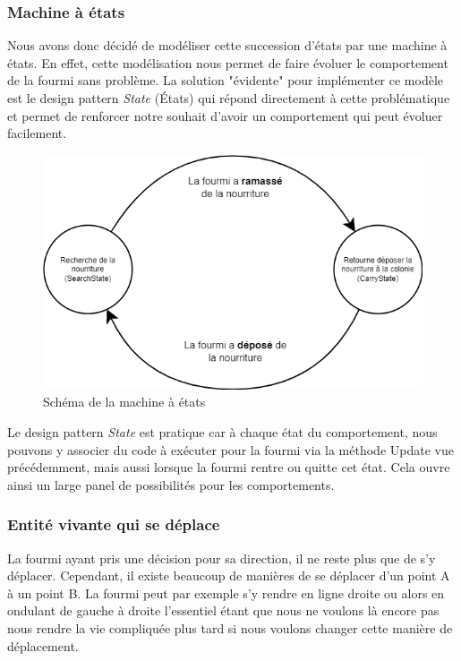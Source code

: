 \documentclass{EPUProjetDi}
\begin{document}
\subsubsection{Machine à états}

Nous avons donc décidé de modéliser cette succession d'états par une machine à états. En effet, cette modélisation nous permet de faire évoluer 
le comportement de la fourmi sans problème. La solution "évidente" pour implémenter ce modèle est le design pattern \textit{State} (États) qui répond
directement à cette problématique et permet de renforcer notre souhait d'avoir un comportement qui peut évoluer facilement.

\begin{figure}[h]
    \centering
    \includegraphics[scale=0.4]{statemachine.png}
    \caption{Schéma de la machine à états}
    \label{fig:state_machine}
\end{figure}

Le design pattern \textit{State} est pratique car à chaque état du comportement, nous pouvons y associer du code à exécuter pour la fourmi via la méthode 
Update vue précédemment, mais aussi lorsque la fourmi rentre ou quitte cet état. Cela ouvre ainsi un large panel de possibilités pour les comportements. 
 
\subsubsection{Entité vivante qui se déplace}

La fourmi ayant pris une décision pour sa direction, il ne reste plus que de s'y déplacer. Cependant, il existe beaucoup de manières de se déplacer
d'un point A à un point B. La fourmi peut par exemple s'y rendre en ligne droite ou alors en ondulant de gauche à droite l'essentiel étant que nous
ne voulons là encore pas nous rendre la vie compliquée plus tard si nous voulons changer cette manière de déplacement.
\end{document}
